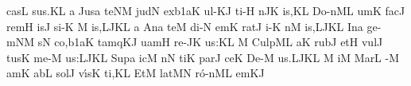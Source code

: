 \spatium
\sgn cas\punctum L\egn
\sgn su{s.}\punctum K\augmentum L\egn
\spatium
\divisiofinalis
\spatium
\custos a
\Internote
\lineaproxima
\sgn Jus\punctum a\egn
\sgn te{}\clivis NM\egn
\spatium
\sgn jud\punctum N\egn
\sgn {}ex\episem b1\clivis aK\egn
\spatium
\sgn {}u{l-}\clivis KJ\egn
\sgn ti-\punctum H\egn
{}n\pes JK\egn
\sgn {}i{s,}\punctum K\augmentum L\egn
\spatium
\divisiominor
\spatium
\sgn Do{-n}\clivis ML\egn
\sgn {}um\punctum K\egn
\spatium
\sgn fac\punctum J\egn
\spatium
\sgn rem\punctum H\egn
\sgn {}is\punctum J\egn
\sgn si-\punctum K\egn
{}\punctum M\egn
\sgn {}i{s,}\porrectus LJK\augmentum L\egn
\spatium
\divisiominor
\spatium
\custos a
\lineaproxima
\sgn {}An\punctum a\egn
\sgn te{}\punctum M\egn
\spatium
\sgn di-\punctum N\egn
\sgn {}em\punctum K\egn
\spatium
\sgn rat\punctum J\egn
\sgn {}i-\punctum K\egn
{}n\punctum M\egn
\sgn {}i{s,}\porrectus LJK\augmentum L\egn
\spatium
\divisiofinalis
\spatium
\sgn {}In\punctum a\egn
\sgn ge{-m}\clivis NM\egn
\sgn {}{\'\i}s\punctum N\egn
\sgn co{,}\episem b1\clivis aK\egn
\spatium
\sgn ta{mq}\clivis KJ\egn
\sgn uam\punctum H\egn
\spatium
\sgn re-\pes JK\egn
\sgn {}u{s:}\punctum K\augmentum L\egn
\spatium
\divisiominor
\spatium
\custos M
\lineaproxima
\sgn Cu{lp}\clivis ML\egn
\sgn {}a{}\punctum K\egn
\spatium
\sgn rub\punctum J\egn
\sgn {}et\punctum H\egn
\spatium
\sgn vul\punctum J\egn
\sgn tus\punctum K\egn
\spatium
\sgn me-\punctum M\egn
\sgn {}u{s:}\porrectus LJK\augmentum L\egn
\spatium
\divisiominor
\spatium
\sgn Sup\punctum a\egn
{}ic\punctum M\egn
{}n\punctum N\egn
\sgn ti{}\punctum K\egn
\spatium
\sgn par\punctum J\egn
\sgn ce{}\punctum K\egn
\spatium
\sgn De-\punctum M\egn
\sgn {}u{s.}\porrectus LJK\augmentum L\egn
\spatium
\divisiofinalis
\spatium\custos M
\Internote
\lineaproxima
{}i{}\punctum M\egn
\spatium
\sgn Mar\punctum L\egn
\sgn {}{\'\i}-\punctum M\egn
\sgn {}am\punctum K\egn
\spatium
\sgn {}ab\punctum L\egn
\sgn sol\punctum J\egn
\sgn v{\'\i}s\punctum K\egn
\sgn ti,\punctum K\augmentum L\egn
\spatium
\divisiominor
\spatium
\sgn {}Et\punctum M\egn
\spatium
\sgn lat\pes MN\egn
\sgn r{\'o}{-n}\clivis ML\egn
\sgn {}em\clivis KJ\egn
